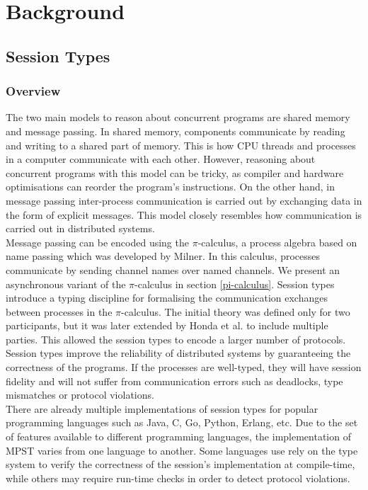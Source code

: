 \documentclass[12pt,twoside]{report}
\begin{document}

\chapter{Background}

\section{Session Types}
\subsection{Overview}

The two main models to reason about concurrent programs are shared memory and message passing. In shared memory, components communicate by reading and writing to a shared part of memory. This is how CPU threads and processes in a computer communicate with each other. However, reasoning about concurrent programs with this model can be tricky, as compiler and hardware optimisations can reorder the program's instructions\cite{sharedmemory}. On the other hand, in message passing inter-process communication is carried out by exchanging data in the form of explicit messages. This model closely resembles how communication is carried out in distributed systems.\\

Message passing can be encoded using the $\pi$-calculus, a process algebra based on name passing which was developed by Milner\cite{milnerpicalc}. In this calculus, processes communicate by sending channel names over named channels. We present an asynchronous variant of the $\pi$-calculus in section \ref{pi-calculus}. Session types\cite{binarysessiontypes1} introduce a typing discipline for formalising the communication exchanges between processes in the $\pi$-calculus. The initial theory was defined only for two participants, but it was later extended by Honda et al.\cite{asyncmpst1, asyncmpst2} to include multiple parties. This allowed the session types to encode a larger number of protocols. Session types improve the reliability of distributed systems by guaranteeing the correctness of the programs. If the processes are well-typed, they will have session fidelity and will not suffer from communication errors such as deadlocks, type mismatches or protocol violations.\\

There are already multiple implementations of session types for popular programming languages such as Java\cite{java}, C\cite{mpstc}, Go\cite{parametrictypes}, Python\cite{python}, Erlang\cite{erlang}, etc. Due to the set of features available to different programming languages, the implementation of MPST varies from one language to another. Some languages use rely on the type system to verify the correctness of the session's implementation at compile-time, while others may require run-time checks in order to detect protocol violations. 
\end{document}
